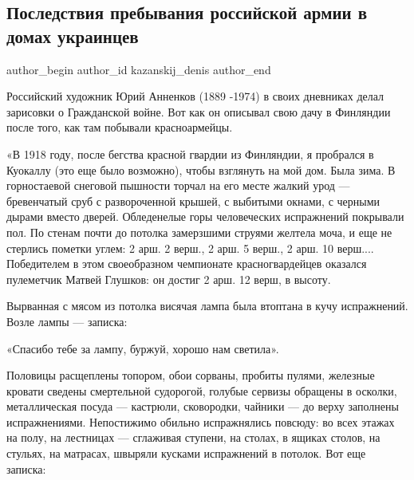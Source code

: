  
 
 
 
 
 
\subsection{Последствия пребывания российской армии в домах украинцев}
\label{sec:12_04_2022.fb.kazanskij_denis.1.rosarmia_doma_ukraincev}
 
\ifcmt
 author_begin
   author_id kazanskij_denis
 author_end
\fi

Российский художник Юрий Анненков (1889 -1974) в своих дневниках делал
зарисовки о Гражданской войне. Вот как он описывал свою дачу в Финляндии после
того, как там побывали красноармейцы. 


«В 1918 году, после бегства красной гвардии из Финляндии, я пробрался в
Куокаллу (это еще было возможно), чтобы взглянуть на мой дом. Была зима. В
горностаевой снеговой пышности торчал на его месте жалкий урод — бревенчатый
сруб с развороченной крышей, с выбитыми окнами, с черными дырами вместо дверей.
Обледенелые горы человеческих испражнений покрывали пол. По стенам почти до
потолка замерзшими струями желтела моча, и еще не стерлись пометки углем: 2
арш. 2 верш., 2 арш. 5 верш., 2 арш. 10 верш.... Победителем в этом
своеобразном чемпионате красногвардейцев оказался пулеметчик Матвей Глушков: он
достиг 2 арш. 12 верш, в высоту.


Вырванная с мясом из потолка висячая лампа была втоптана в кучу испражнений.
Возле лампы — записка:

«Спасибо тебе за лампу, буржуй, хорошо нам светила».


Половицы расщеплены топором, обои сорваны, пробиты пулями, железные кровати
сведены смертельной судорогой, голубые сервизы обращены в осколки,
металлическая посуда — кастрюли, сковородки, чайники — до верху заполнены
испражнениями. Непостижимо обильно испражнялись повсюду: во всех этажах на
полу, на лестницах — сглаживая ступени, на столах, в ящиках столов, на стульях,
на матрасах, швыряли кусками испражнений в потолок. Вот еще записка:

